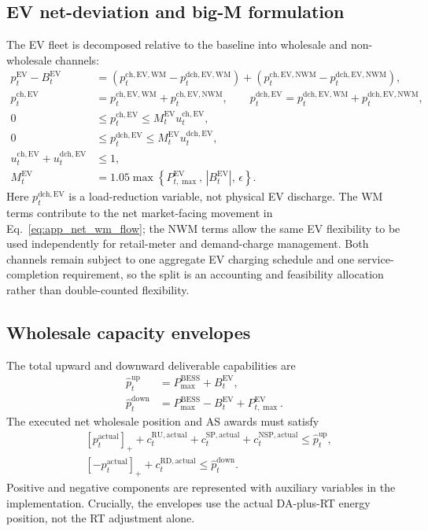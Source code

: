 \documentclass[final,5p,times]{elsarticle}
\newcommand{\EV}{\mathrm{EV}}
\newcommand{\BESS}{\mathrm{BESS}}
\newcommand{\RU}{\mathrm{RU}}
\newcommand{\RD}{\mathrm{RD}}
\newcommand{\SP}{\mathrm{SP}}
\newcommand{\NSP}{\mathrm{NSP}}
\newcommand{\WM}{\mathrm{WM}}
\newcommand{\NWM}{\mathrm{NWM}}
\newcommand{\ch}{\mathrm{ch}}
\newcommand{\dch}{\mathrm{dch}}
\newcommand{\up}{\mathrm{up}}
\newcommand{\down}{\mathrm{down}}
\newcommand{\pos}[1]{\left[#1\right]_+}
\begin{document}
\subsection{EV net-deviation and big-M formulation}
The EV fleet is decomposed relative to the baseline into wholesale and non-wholesale channels:
\begin{align}
p_t^{\EV}-B_t^{\EV}
&=\left(p_t^{\ch,\EV,\WM}-p_t^{\dch,\EV,\WM}\right)
+\left(p_t^{\ch,\EV,\NWM}-p_t^{\dch,\EV,\NWM}\right),\label{eq:app_ev_deviation}\\
p_t^{\ch,\EV}&=p_t^{\ch,\EV,\WM}+p_t^{\ch,\EV,\NWM},\qquad
p_t^{\dch,\EV}=p_t^{\dch,\EV,\WM}+p_t^{\dch,\EV,\NWM},\label{eq:app_ev_channel_split}\\
0&\le p_t^{\ch,\EV}\le M_t^{\EV}u_t^{\ch,\EV},\label{eq:app_ev_ch}\\
0&\le p_t^{\dch,\EV}\le M_t^{\EV}u_t^{\dch,\EV},\label{eq:app_ev_dch}\\
u_t^{\ch,\EV}+u_t^{\dch,\EV}&\le 1,\label{eq:app_ev_dir}\\
M_t^{\EV}&=1.05\max\left\{P_{t,\max}^{\EV},\,|B_t^{\EV}|,\,\epsilon\right\}.\label{eq:app_ev_bigM}
\end{align}
Here $p_t^{\dch,\EV}$ is a load-reduction variable, not physical EV discharge. The WM terms contribute to the net market-facing movement in Eq.~\eqref{eq:app_net_wm_flow}; the NWM terms allow the same EV flexibility to be used independently for retail-meter and demand-charge management. Both channels remain subject to one aggregate EV charging schedule and one service-completion requirement, so the split is an accounting and feasibility allocation rather than double-counted flexibility.

\subsection{Wholesale capacity envelopes}
The total upward and downward deliverable capabilities are
\begin{align}
\hat p_t^{\up}&=P_{\max}^{\BESS}+B_t^{\EV},\label{eq:app_upcap}\\
\hat p_t^{\down}&=P_{\max}^{\BESS}-B_t^{\EV}+P_{t,\max}^{\EV}.\label{eq:app_downcap}
\end{align}
The executed net wholesale position and AS awards must satisfy
\begin{align}
&\pos{p_t^{\mathrm{actual}}}
+c_t^{\RU,\mathrm{actual}}+c_t^{\SP,\mathrm{actual}}+c_t^{\NSP,\mathrm{actual}}
\le \hat p_t^{\up},\label{eq:app_upenv}\\
&\pos{-p_t^{\mathrm{actual}}}+c_t^{\RD,\mathrm{actual}}
\le \hat p_t^{\down}.\label{eq:app_downenv}
\end{align}
Positive and negative components are represented with auxiliary variables in the implementation. Crucially, the envelopes use the actual DA-plus-RT energy position, not the RT adjustment alone.
\end{document}
